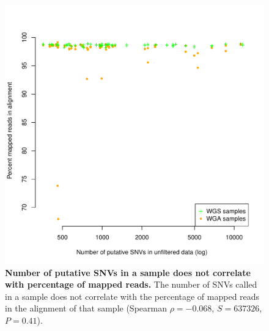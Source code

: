 \documentclass[11 pt]{article} %
\begin{document}
\begin{figure}
\centerline{
\includegraphics[width=5in]{FigureS3.pdf} }
\caption{\textbf{Number of putative SNVs in a sample does not correlate with percentage of mapped reads.} The number of SNVs called in a sample does not correlate with the percentage of mapped reads in the alignment of that sample  (Spearman $\rho=-0.068$, $S=637326$, $P=0.41$).} 
\label{fig:percent_mapped}
\end{figure}

\end{document}
